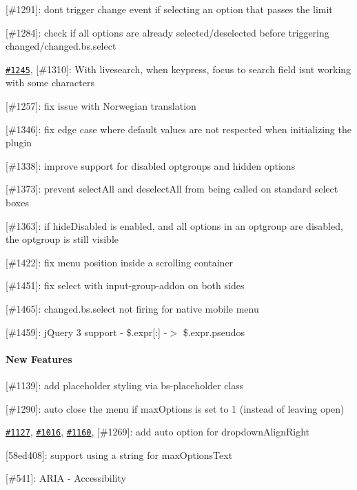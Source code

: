 \begin{DoxyItemize}
\item \mbox{[}\#1291\mbox{]}\+: don\textquotesingle{}t trigger change event if selecting an option that passes the limit
\item \mbox{[}\#1284\mbox{]}\+: check if all options are already selected/deselected before triggering changed/changed.\+bs.\+select
\item \href{https://github.com/silviomoreto/bootstrap-select/issues/1245}{\tt \#1245}, \mbox{[}\#1310\mbox{]}\+: With livesearch, when keypress, focus to search field isn\textquotesingle{}t working with some characters
\item \mbox{[}\#1257\mbox{]}\+: fix issue with Norwegian translation
\item \mbox{[}\#1346\mbox{]}\+: fix edge case where default values are not respected when initializing the plugin
\item \mbox{[}\#1338\mbox{]}\+: improve support for disabled optgroups and hidden options
\item \mbox{[}\#1373\mbox{]}\+: prevent select\+All and deselect\+All from being called on standard select boxes
\item \mbox{[}\#1363\mbox{]}\+: if hide\+Disabled is enabled, and all options in an optgroup are disabled, the optgroup is still visible
\item \mbox{[}\#1422\mbox{]}\+: fix menu position inside a scrolling container
\item \mbox{[}\#1451\mbox{]}\+: fix select with input-\/group-\/addon on both sides
\item \mbox{[}\#1465\mbox{]}\+: changed.\+bs.\+select not firing for native mobile menu
\item \mbox{[}\#1459\mbox{]}\+: j\+Query 3 support -\/ \$.expr\mbox{[}\textquotesingle{}\+:\textquotesingle{}\mbox{]} -\/$>$ \$.expr.\+pseudos
\end{DoxyItemize}

\paragraph*{New Features}


\begin{DoxyItemize}
\item \mbox{[}\#1139\mbox{]}\+: add placeholder styling via {\ttfamily bs-\/placeholder} class
\item \mbox{[}\#1290\mbox{]}\+: auto close the menu if max\+Options is set to 1 (instead of leaving open)
\item \href{https://github.com/silviomoreto/bootstrap-select/issues/1127}{\tt \#1127}, \href{https://github.com/silviomoreto/bootstrap-select/issues/1016}{\tt \#1016}, \href{https://github.com/silviomoreto/bootstrap-select/issues/1160}{\tt \#1160}, \mbox{[}\#1269\mbox{]}\+: add \textquotesingle{}auto\textquotesingle{} option for dropdown\+Align\+Right
\item \mbox{[}58ed408\mbox{]}\+: support using a string for max\+Options\+Text
\item \mbox{[}\#541\mbox{]}\+: A\+R\+IA -\/ Accessibility
\end{DoxyItemize}





